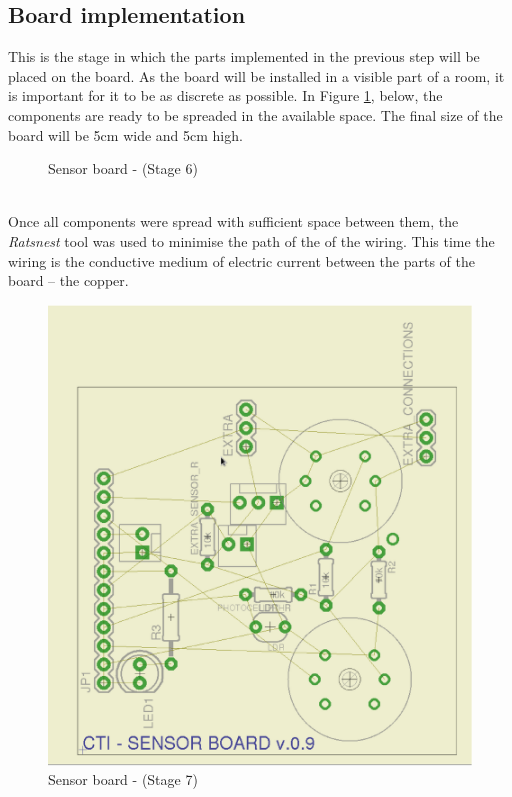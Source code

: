 \documentclass[12pt,a4paper,draft]{report}
\begin{document}
\subsection{Board implementation}
This is the stage in which the parts implemented in the previous step will be placed on the board.
As the board will be installed in a visible part of a room, it is important for it to be as discrete as possible.
In Figure \ref{Sensor-brd-s6}, below, the components are ready to be spreaded in the available space.
The final size of the board will be 5cm wide and 5cm high.
\ \\
\begin{figure}[H]
\centering
\caption{Sensor board -  (Stage 6)}
\label{Sensor-brd-s6}
\end{figure}
\ \\
Once all components were spread with sufficient space between them, the \textit{Ratsnest} tool was used to minimise the path of the of the wiring.
This time the wiring is the conductive medium of electric current between the parts of the board -- the copper.
\ \\
\begin{figure}[H]
\centering
\includegraphics*[scale=0.25]{sens_brd_s7}
\caption{Sensor board -  (Stage 7)}
\label{Sensor-brd-s7}
\end{figure}
\end{document}
